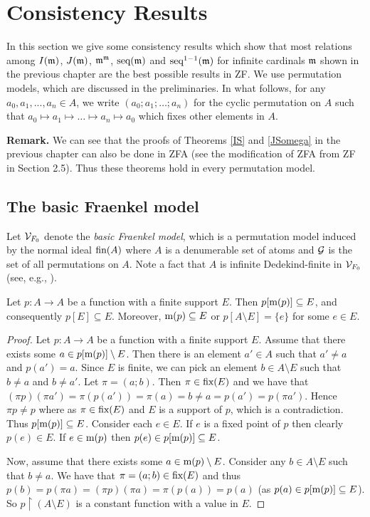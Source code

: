 \chapter{Consistency Results}


In this section we give some consistency results which show that most relations among $I(\frak{m})$, $J(\frak{m})$, $\frak{m}^\frak{m}$, $\seq(\frak{m})$ and $\seq^{1-1}(\frak{m})$ for infinite cardinals $\frak{m}$ shown in the previous chapter are the best possible results in ZF. We use permutation models, which are discussed in the preliminaries. In what follows, for any $a_{0},a_{1},...,a_{n}\in A$, we write $(a_0; a_1; \dotsc; a_n)$ for the cyclic permutation on $A$ such that $a_0 \mapsto a_1 \mapsto \dotsc \mapsto a_n \mapsto a_0$ which fixes other elements in $A$.

\noindent\textbf{Remark.} We can see that the proofs of Theorems \ref{IS} and \ref{JSomega} in the previous chapter can also be done in ZFA (see the modification of ZFA from ZF in Section 2.5). Thus these theorems hold in every permutation model.


\section{The basic Fraenkel model}

Let $\mcal{V}_{F_{0}}$ denote the \emph{basic Fraenkel model}, which is a permutation model induced by the normal ideal $\fin(A)$ where $A$ is a denumerable set of atoms and $\mcal{G}$ is the set of all permutations on $A$. Note a fact that $A$ is infinite Dedekind-finite in $\mcal{V}_{F_{0}}$ (see, e.g., \cite{Jech}).

\begin{lemma}\label{VF0lemma}
Let $p:A\to A$ be a function with a finite support $E$. Then $p[\m(p)]\subseteq E$, and consequently $p[E]\subseteq E$. Moreover, $\m(p)\subseteq E$ or $p[A\setminus E]=\{e\}$ for some $e\in E$.
\end{lemma}

\begin{proof}
Let $p:A\to A$ be a function with a finite support $E$. Assume that there exists some $a\in p[\m(p)]\setminus E$. Then there is an element $a'\in A$ such that $a'\neq a$ and $p(a')=a$. Since $E$ is finite, we can pick an element $b\in A\setminus E$ such that $b\neq a$ and $b\neq a'$. Let $\pi=(a;b) $. Then $\pi \in \fix(E)$ and we have that $(\pi p)(\pi a')=\pi(p(a'))=\pi(a)=b\neq a=p(a')=p(\pi a')$. Hence $\pi p\neq p$ where as $\pi\in\fix(E)$ and $E$ is a support of $p$, which is a contradiction. Thus $p[\m(p)]\subseteq E$. Consider each $e\in E$. If $e$ is a fixed point of $p$ then clearly $p(e)\in E$. If $e\in\m(p)$ then $p(e)\in p[\m(p)]\subseteq E$.

Now, assume that there exists some $a\in \m(p)\setminus E$. Consider any $b\in A\setminus E$ such that $b\neq a$. We have that $\pi=(a;b)\in\fix(E)$ and thus $p(b)=p(\pi a)=(\pi p)(\pi a)=\pi(p(a))=p(a)$ (as $p(a)\in p[\m(p)]\subseteq E$). So $p\restriction (A\setminus E)$ is a constant function with a value in $E$. 
\end{proof}

